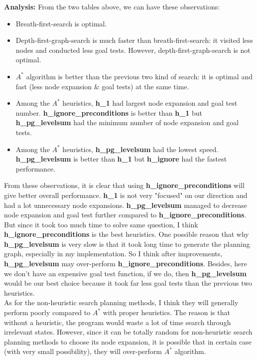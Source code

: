 \documentclass{article}
\begin{document}
   \textbf{Analysis:}
   From the two tables above, we can have these observations:
   \begin{itemize}
    \item Breath-first-search is optimal.
    \item Depth-first-graph-search is much faster than breath-first-search: it visited less nodes and conducted less goal tests. However, depth-first-graph-search is not optimal.
    \item \(A^*\) algorithm is better than the previous two kind of search: it is optimal and fast (less node expansion & goal tests) at the same time.
    \item Among the \(A^*\) heuristics, \textbf{h\_1} had largest node expansion and goal test number. \textbf{h\_ignore\_preconditions} is better than \textbf{h\_1} but \textbf{h\_pg\_levelsum} had the minimum number of node expansion and goal tests.
    \item Among the \(A^*\) heuristics, \textbf{h\_pg\_levelsum} had the lowest speed.  \textbf{h\_pg\_levelsum} is better than \textbf{h\_1} but \textbf{h\_ignore\preconditions} had the fastest performance.
  \end{itemize}

  From these observations, it is clear that using \textbf{h\_ignore\_preconditions} will give better overall performance. \textbf{h\_1} is not very "focused" on our direction and had a lot unnecessary node expansions.
  \textbf{h\_pg\_levelsum} managed to decrease node expansion and goal test further compared to \textbf{h\_ignore\_preconditions}. But since it took too much time to solve same question,
  I think \textbf{h\_ignore\_preconditions} is the best heuristics. One possible reason that why \textbf{h\_pg\_levelsum} is very slow is that it took long time to generate the planning graph, especially in my implementation.
  So I think after improvements, \textbf{h\_pg\_levelsum} may over-perform \textbf{h\_ignore\_preconditions}. Besides, here we don't have an expensive goal test function, if we do, then \textbf{h\_pg\_levelsum} would be
  our best choice because it took far less goal tests than the previous two heuristics.\\

  As for the non-heuristic search planning methods, I think they will generally perform poorly compared to \(A^*\) with proper heuristics. The reason is that without a heuristic, the program would waste a lot of time search through
  irrelevant states. However, since it can be totally random for non-heuristic search planning methods to choose its node expansion, it is possible that in certain case (with very small possibility), they will over-perform \(A^*\) algorithm. 
\end{document}
